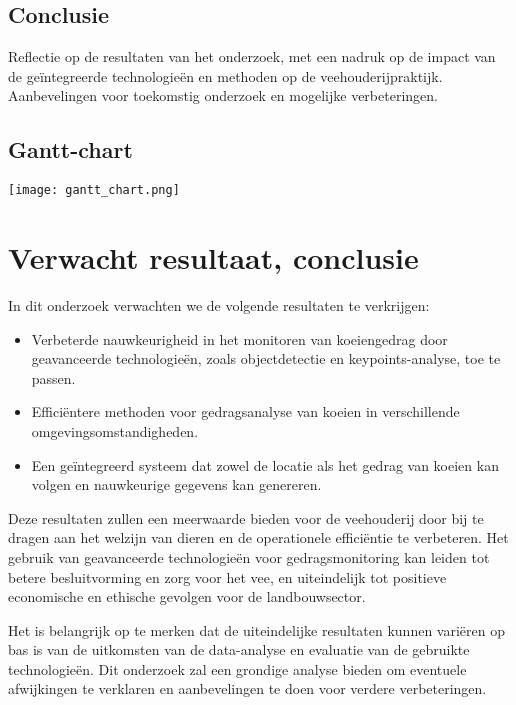 \subsection{Conclusie}
Reflectie op de resultaten van het onderzoek, met een nadruk op de impact van de geïntegreerde technologieën en methoden op de veehouderijpraktijk. 
Aanbevelingen voor toekomstig onderzoek en mogelijke verbeteringen.
\subsection{Gantt-chart}
\newline
\texttt{[image: gantt\_chart.png]}
\newline
\section{Verwacht resultaat, conclusie}%
\label{sec:verwachte_resultaten}
In dit onderzoek verwachten we de volgende resultaten te verkrijgen:
\begin{itemize}
  \item Verbeterde nauwkeurigheid in het monitoren van koeiengedrag door geavanceerde technologieën, zoals objectdetectie en \newline keypoints-analyse, toe te passen.
  \item Efficiëntere methoden voor gedragsanalyse van koeien in verschillende omgevingsomstandigheden.
  \item Een geïntegreerd systeem dat zowel de locatie als het gedrag van koeien kan volgen en nauwkeurige gegevens kan genereren.
\end{itemize}
Deze resultaten zullen een meerwaarde bieden voor de veehouderij door bij te dragen aan het welzijn van dieren en de operationele efficiëntie te verbeteren. Het gebruik van geavanceerde technologieën voor gedragsmonitoring kan leiden tot betere besluitvorming en zorg voor het vee, en uiteindelijk tot positieve economische en ethische gevolgen voor de landbouwsector.

Het is belangrijk op te merken dat de uiteindelijke resultaten kunnen variëren op bas
is van de uitkomsten van de data-analyse en evaluatie van de gebruikte technologieën. Dit onderzoek zal een grondige analyse bieden om eventuele afwijkingen te verklaren en aanbevelingen te doen voor verdere verbeteringen.
